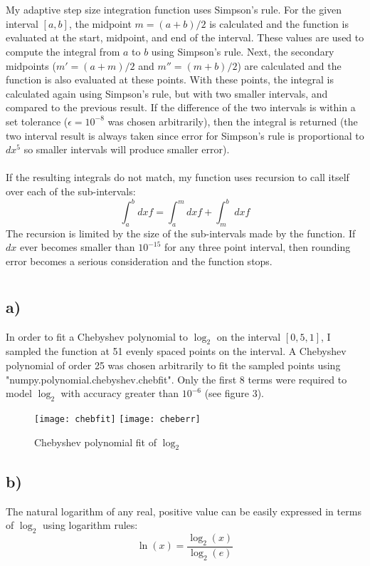 \documentclass{article}
\newcommand{\<}[1]{\left\langle #1 \right\rangle }
\begin{document}
\section{}
My adaptive step size integration function uses Simpson's rule. For the given interval $[a, b]$, the midpoint $m = (a+b)/2$ is calculated and the function is evaluated at the start, midpoint, and end of the interval. These values are used to compute the integral from $a$ to $b$ using Simpson's rule. Next, the secondary midpoints ($m' = (a+m)/2$ and $m'' = (m+b)/2$) are calculated and the function is also evaluated at these points. With these points, the integral is calculated again using Simpson's rule, but with two smaller intervals, and compared to the previous result. If the difference of the two intervals is within a set tolerance ($\epsilon = 10^{-8}$ was chosen arbitrarily), then the integral is returned (the two interval result is always taken since error for Simpson's rule is proportional to $dx^5$ so smaller intervals will produce smaller error).\\
\\
If the resulting integrals do not match, my function uses recursion to call itself over each of the sub-intervals:
\[\int_a^b dx f = \int_a^m dx f + \int_m^b dx f \]
The recursion is limited by the size of the sub-intervals made by the function. If $dx$ ever becomes smaller than $10^{-15}$ for any three point interval, then rounding error becomes a serious consideration and the function stops.
 
\section{}
\subsection{a)}
In order to fit a Chebyshev polynomial to $\log_2$ on the interval $[0,5, 1]$, I sampled the function at 51 evenly spaced points on the interval. A Chebyshev polynomial of order 25 was chosen arbitrarily to fit the sampled points using "numpy.polynomial.chebyshev.chebfit". Only the first 8 terms were required to model $\log_2$ with accuracy greater than $10^{-6}$ (see figure 3).
\begin{figure}[h]
	\caption{Chebyshev polynomial fit of $\log_2$}
	\centering
	\texttt{[image: chebfit]}
	\texttt{[image: cheberr]}
\end{figure} 

\subsection{b)}
The natural logarithm of any real, positive value can be easily expressed in terms of $\log_2$ using logarithm rules:
\[\ln(x) = \frac{\log_2(x)}{\log_2(e)}\]
\end{document}
